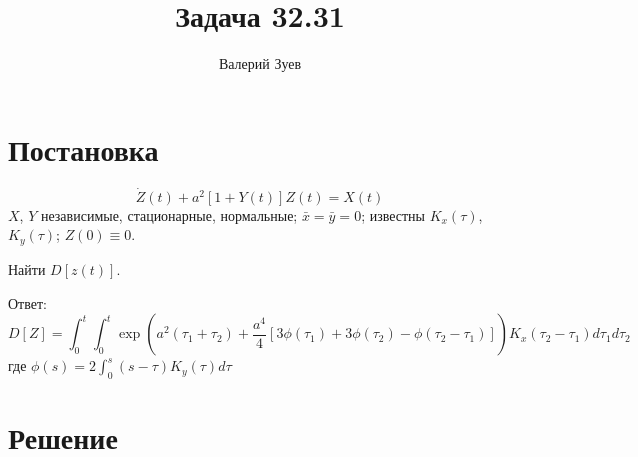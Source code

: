 \documentclass[a4paper,12pt]{article}
\begin{document}
\title{Задача 32.31}
\author{Валерий Зуев}
\maketitle

\section{Постановка}
\[ \dot Z(t) + a^2 [1 + Y(t)]Z(t) = X(t) \]
$X$, $Y$ независимые, стационарные, нормальные; $\bar x = \bar y = 0$;
известны $K_x(\tau)$, $K_y(\tau)$; $Z(0)\equiv0$.

Найти $D[z(t)]$.

\begin{leftbar}
    Ответ:
    \begin{equation} \label{eq:ans}
        D[Z] = \int_{0}^{t} \int_{0}^{t} \exp\left( a^2(\tau_1+\tau_2) + \frac{a^4}{4} [ 3 \phi(\tau_1) + 3 \phi(\tau_2) - \phi(\tau_2-\tau_1) ] \right) K_x(\tau_2 - \tau_1) d\tau_1 d\tau_2
    \end{equation}
    где $ \phi(s) = 2 \int_0^s (s-\tau) K_y(\tau) d \tau $
\end{leftbar}

\section{Решение}
\end{document}
